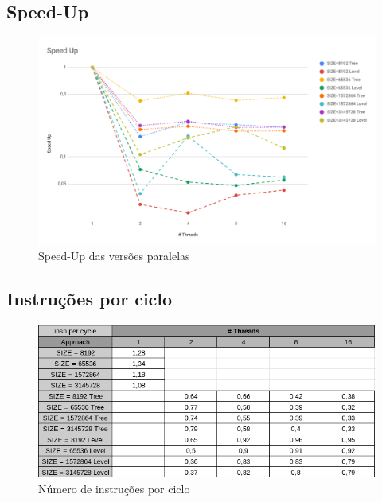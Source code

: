 \documentclass{article}
\begin{document}
\begin{appendices}
\subsection{Speed-Up}
\begin{figure}[H]
    \centering
    \includegraphics[width=18cm]{Pictures/SpeedUp.png}
    \caption{Speed-Up das versões paralelas}
    \label{fig:speed_up}
\end{figure}

\subsection{Instruções por ciclo}
\begin{figure}[H]
    \centering
    \includegraphics[width=18cm]{Pictures/tableInsPerCycle.png}
    \caption{Número de instruções por ciclo}
    \label{fig:inst_per_cycle_table}
\end{figure}


\end{appendices}
\end{document}
